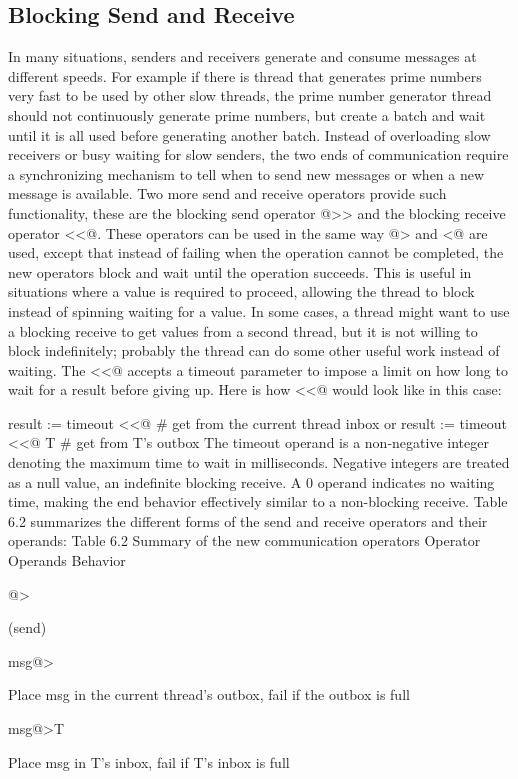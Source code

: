\subsection{Blocking Send and Receive}
In many situations, senders and receivers generate and consume messages at
different speeds. For example if there is thread that generates prime numbers
very fast to be used by other slow threads, the prime number generator thread
should not continuously generate prime numbers, but create a batch and wait until
it is all used before generating another batch. Instead of overloading slow
receivers or busy waiting for slow senders, the two ends of communication require
a synchronizing mechanism to tell when to send new messages or when a new message
is available. Two more send and receive operators provide such functionality, these
are the blocking send operator @>> and the blocking receive operator <<@. These
operators can be used in the same way @> and <@ are used, except that instead of
failing when the operation cannot be completed, the new operators block and wait
until the operation succeeds. This is useful in situations where a value is
required to proceed, allowing the thread to block instead of spinning waiting for
a value.
In some cases, a thread might want to use a blocking receive to get values from
a second thread, but it is not willing to block indefinitely; probably the thread
can do some other useful work instead of waiting. The <<@  accepts a timeout parameter
to impose a limit on how long to wait for a result before giving up. Here is how
<<@ would look like in this case:

result := timeout <<@ 		\#  get from the current thread inbox
or 
result := timeout <<@ T		\# get from T's outbox
The timeout operand is a non-negative integer denoting the maximum time to wait in milliseconds. Negative integers are treated as a null value, an indefinite blocking receive. A 0 operand indicates no waiting time, making the end behavior effectively similar to a non-blocking receive. Table 6.2 summarizes the different forms of the send and receive operators and their operands:
Table 6.2 Summary of the new communication operators
Operator
Operands
Behavior

@> 

(send)

msg@>

Place msg in the current thread's outbox, fail if the outbox is full

msg@>T

Place msg in T's inbox, fail if T's inbox is full

